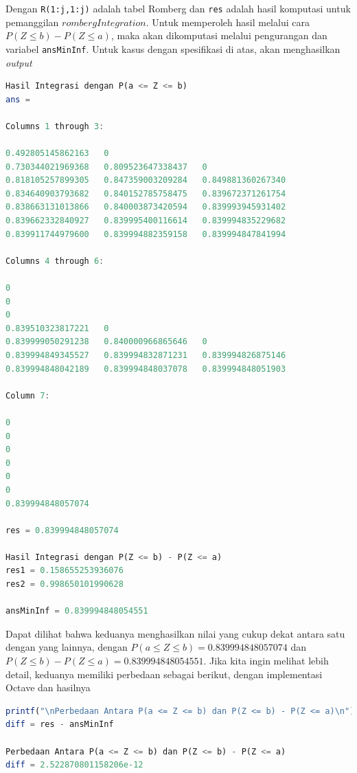 \documentclass[journal,12pt,onecolumn,a4paper]{IEEEtran}
\begin{document}
Dengan \lstinline{R(1:j,1:j)} adalah tabel Romberg dan \lstinline{res} adalah hasil komputasi untuk pemanggilan \(rombergIntegration\). Untuk memperoleh hasil melalui cara \(P(Z \le b ) - P(Z \le a )\), maka akan dikomputasi melalui pengurangan dan variabel \lstinline{ansMinInf}. Untuk kasus dengan spesifikasi di atas, akan menghasilkan \emph{output}

\begin{center}
	\begin{lstlisting}[language=Octave]
Hasil Integrasi dengan P(a <= Z <= b)
ans =

Columns 1 through 3:

0.492805145862163   0                   
0.730344021969368   0.809523647338437   0
0.818105257899305   0.847359003209284   0.849881360267340
0.834640903793682   0.840152785758475   0.839672371261754
0.838663131013866   0.840003873420594   0.839993945931402
0.839662332840927   0.839995400116614   0.839994835229682
0.839911744979600   0.839994882359158   0.839994847841994

Columns 4 through 6:

0
0
0 
0.839510323817221	0
0.839999050291238	0.840000966865646	0
0.839994849345527	0.839994832871231	0.839994826875146
0.839994848042189	0.839994848037078	0.839994848051903

Column 7:

0
0
0
0
0
0
0.839994848057074

res = 0.839994848057074

Hasil Integrasi dengan P(Z <= b) - P(Z <= a)
res1 = 0.158655253936076
res2 = 0.998650101990628

ansMinInf = 0.839994848054551
	\end{lstlisting}
\end{center}

Dapat dilihat bahwa keduanya menghasilkan nilai yang cukup dekat antara satu dengan yang lainnya, dengan \(P(a \le Z \le b)= 0.839994848057074\)  dan \(P(Z \le b ) - P(Z \le a ) = 0.839994848054551\). Jika kita ingin melihat lebih detail, keduanya memiliki perbedaan sebagai berikut, dengan implementasi Octave dan hasilnya

\begin{center}
	\begin{lstlisting}[language=Octave]
printf("\nPerbedaan Antara P(a <= Z <= b) dan P(Z <= b) - P(Z <= a)\n")
diff = res - ansMinInf

Perbedaan Antara P(a <= Z <= b) dan P(Z <= b) - P(Z <= a)
diff = 2.522870801158206e-12
	\end{lstlisting}
\end{center}
\end{document}
